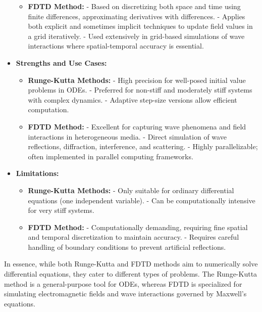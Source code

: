 \begin{airesult}
\begin{itemize}
\begin{itemize}
  \item \textbf{FDTD Method:}
    - Based on discretizing both space and time using finite differences, approximating derivatives
with differences.
    - Applies both explicit and sometimes implicit techniques to update field values in a grid
iteratively.
    - Used extensively in grid-based simulations of wave interactions where spatial-temporal
accuracy is essential.

  \end{itemize}

\item \textbf{Strengths and Use Cases:}

  \begin{itemize}
  \item \textbf{Runge-Kutta Methods:}
    - High precision for well-posed initial value problems in ODEs.
    - Preferred for non-stiff and moderately stiff systems with complex dynamics.
    - Adaptive step-size versions allow efficient computation.

  \item \textbf{FDTD Method:}
    - Excellent for capturing wave phenomena and field interactions in heterogeneous media.
    - Direct simulation of wave reflections, diffraction, interference, and scattering.
    - Highly parallelizable; often implemented in parallel computing frameworks.

  \end{itemize}

\item \textbf{Limitations:}

  \begin{itemize}
  \item \textbf{Runge-Kutta Methods:}
    - Only suitable for ordinary differential equations (one independent variable).
    - Can be computationally intensive for very stiff systems.

  \item \textbf{FDTD Method:}
    - Computationally demanding, requiring fine spatial and temporal discretization to maintain
accuracy.
    - Requires careful handling of boundary conditions to prevent artificial reflections.

  \end{itemize}

\end{itemize}

\vsp

In essence, while both Runge-Kutta and FDTD methods aim to numerically solve differential equations,
they cater to different types of problems. The Runge-Kutta method is a general-purpose tool for
ODEs, whereas FDTD is specialized for simulating electromagnetic fields and wave interactions
governed by Maxwell's equations.
\end{airesult}

